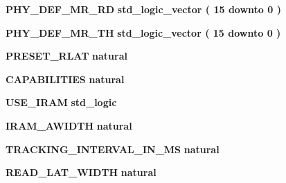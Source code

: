 \begin{DoxyCompactItemize}
\item 
{\bf P\+H\+Y\+\_\+\+D\+E\+F\+\_\+\+M\+R\+\_\+RD} {\bfseries {\bfseries \textcolor{comment}{std\+\_\+logic\+\_\+vector}\textcolor{vhdlchar}{ }\textcolor{vhdlchar}{(}\textcolor{vhdlchar}{ }\textcolor{vhdlchar}{ } \textcolor{vhdldigit}{15} \textcolor{vhdlchar}{ }\textcolor{keywordflow}{downto}\textcolor{vhdlchar}{ }\textcolor{vhdlchar}{ } \textcolor{vhdldigit}{0} \textcolor{vhdlchar}{ }\textcolor{vhdlchar}{)}\textcolor{vhdlchar}{ }}}
\item 
{\bf P\+H\+Y\+\_\+\+D\+E\+F\+\_\+\+M\+R\+\_\+TH} {\bfseries {\bfseries \textcolor{comment}{std\+\_\+logic\+\_\+vector}\textcolor{vhdlchar}{ }\textcolor{vhdlchar}{(}\textcolor{vhdlchar}{ }\textcolor{vhdlchar}{ } \textcolor{vhdldigit}{15} \textcolor{vhdlchar}{ }\textcolor{keywordflow}{downto}\textcolor{vhdlchar}{ }\textcolor{vhdlchar}{ } \textcolor{vhdldigit}{0} \textcolor{vhdlchar}{ }\textcolor{vhdlchar}{)}\textcolor{vhdlchar}{ }}}
\item 
{\bf P\+R\+E\+S\+E\+T\+\_\+\+R\+L\+AT} {\bfseries {\bfseries \textcolor{comment}{natural}\textcolor{vhdlchar}{ }}}
\item 
{\bf C\+A\+P\+A\+B\+I\+L\+I\+T\+I\+ES} {\bfseries {\bfseries \textcolor{comment}{natural}\textcolor{vhdlchar}{ }}}
\item 
{\bf U\+S\+E\+\_\+\+I\+R\+AM} {\bfseries {\bfseries \textcolor{comment}{std\+\_\+logic}\textcolor{vhdlchar}{ }}}
\item 
{\bf I\+R\+A\+M\+\_\+\+A\+W\+I\+D\+TH} {\bfseries {\bfseries \textcolor{comment}{natural}\textcolor{vhdlchar}{ }}}
\item 
{\bf T\+R\+A\+C\+K\+I\+N\+G\+\_\+\+I\+N\+T\+E\+R\+V\+A\+L\+\_\+\+I\+N\+\_\+\+MS} {\bfseries {\bfseries \textcolor{comment}{natural}\textcolor{vhdlchar}{ }}}
\item 
{\bf R\+E\+A\+D\+\_\+\+L\+A\+T\+\_\+\+W\+I\+D\+TH} {\bfseries {\bfseries \textcolor{comment}{natural}\textcolor{vhdlchar}{ }}}
\end{DoxyCompactItemize}
